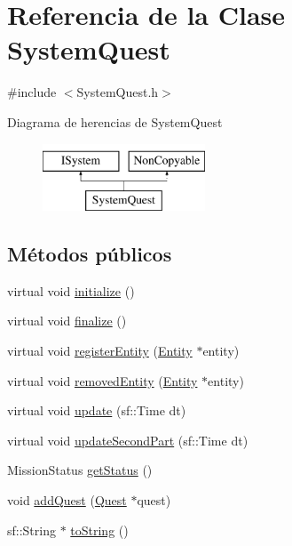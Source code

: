 \hypertarget{classSystemQuest}{}\section{Referencia de la Clase System\+Quest}
\label{classSystemQuest}


{\ttfamily \#include $<$System\+Quest.\+h$>$}

Diagrama de herencias de System\+Quest\begin{figure}[H]
\begin{center}
\leavevmode
\includegraphics[height=2.000000cm]{classSystemQuest}
\end{center}
\end{figure}
\subsection*{Métodos públicos}
\begin{DoxyCompactItemize}
\item 
virtual void \hyperlink{classSystemQuest_a48773430521559d0b5eaa931b53d8892}{initialize} ()
\item 
virtual void \hyperlink{classSystemQuest_a3c9f834570acf2277d4620e3ba16992d}{finalize} ()
\item 
virtual void \hyperlink{classSystemQuest_a03ce5db7875898ebae8c9424c1888c37}{register\+Entity} (\hyperlink{classEntity}{Entity} $\ast$entity)
\item 
virtual void \hyperlink{classSystemQuest_a588e9982c16288af4675b67bf9177080}{removed\+Entity} (\hyperlink{classEntity}{Entity} $\ast$entity)
\item 
virtual void \hyperlink{classSystemQuest_a76892fc5b11bdb7132e7499e46eb7977}{update} (sf\+::\+Time dt)
\item 
virtual void \hyperlink{classSystemQuest_a3069bdc81a590c47c4479b63add3fc3d}{update\+Second\+Part} (sf\+::\+Time dt)
\item 
Mission\+Status \hyperlink{classSystemQuest_a6469f12a86c708f7661482aad85b1de7}{get\+Status} ()
\item 
void \hyperlink{classSystemQuest_aca9a6f845d267fc9ef58d6531b341094}{add\+Quest} (\hyperlink{classQuest}{Quest} $\ast$quest)
\item 
sf\+::\+String $\ast$ \hyperlink{classSystemQuest_a3c5b341ae4087af5b1a0a0386905bfd7}{to\+String} ()
\end{DoxyCompactItemize}
